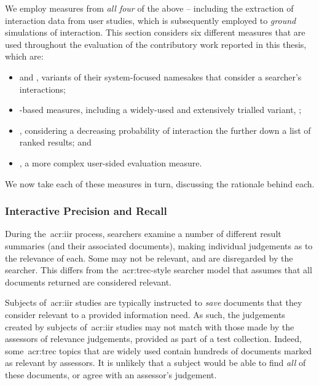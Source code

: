 We employ measures from \emph{all four} of the above -- including the extraction of interaction data from user studies, which is subsequently employed to \emph{ground} simulations of interaction. This section considers six different measures that are used throughout the evaluation of the contributory work reported in this thesis, which are:

\begin{itemize}
    \item{ and , variants of their system-focused namesakes that consider a searcher's interactions;}
    \item{-based measures, including a widely-used and extensively trialled variant, ;}
    \item{, considering a decreasing probability of interaction the further down a list of ranked results; and}
    \item{, a more complex user-sided evaluation measure.}
\end{itemize}

We now take each of these measures in turn, discussing the rationale behind each.

\subsubsection{Interactive Precision and Recall}\label{sec:ir_background:evaluation:user:ipr}
During the~\gls{acr:iir} process, searchers examine a number of different result summaries (and their associated documents), making individual judgements as to the relevance of each. Some may not be relevant, and are disregarded by the searcher. This differs from the~\gls{acr:trec}-style searcher model that assumes that all documents returned are considered relevant.

Subjects of~\gls{acr:iir} studies are typically instructed to \emph{save} documents that they consider relevant to a provided information need. As such, the judgements created by subjects of~\gls{acr:iir} studies may not match with those made by the assessors of relevance judgements, provided as part of a test collection. Indeed, some~\gls{acr:trec} topics that are widely used contain hundreds of documents marked as relevant by assessors. It is unlikely that a subject would be able to find \emph{all} of these documents, or agree with an assessor's judgement.

